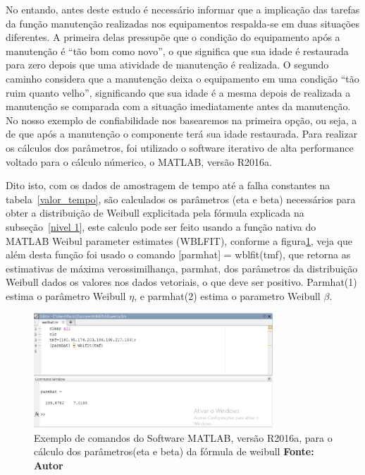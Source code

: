 No entando, antes deste estudo é necessário informar que a implicação das tarefas da função manutenção realizadas nos equipamentos respalda-se em duas situações diferentes. A primeira delas pressupõe que o condição do equipamento após a manutenção é “tão bom como novo”, o que significa que sua idade é restaurada para zero depois que uma atividade de manutenção é realizada. O segundo caminho considera que a manutenção deixa o equipamento em uma condição “tão ruim quanto velho”, significando que sua idade é a mesma depois de realizada a manutenção se comparada com a situação imediatamente antes da manutenção. No nosso exemplo de confiabilidade nos basearemos na primeira opção, ou seja, a de que após a manutenção o componente terá sua idade restaurada. Para realizar os cálculos dos parâmetros, foi utilizado o software iterativo de alta performance voltado para o cálculo númerico, o MATLAB, versão R2016a.

Dito isto, com os dados de amostragem de tempo até a falha constantes na tabela~\ref{valor_tempo}, são calculados os parâmetros (eta e beta) necessários para obter a distribuição de Weibull explicitada pela fórmula explicada na subseção~\ref{nivel 1}, este calculo pode ser feito usando a função nativa do MATLAB Weibul parameter estimates (WBLFIT), conforme a figura\ref{parametros_weibull}, veja que além desta função foi usado o comando [parmhat] = wblfit(tmf), que retorna as estimativas de máxima verossimilhança, parmhat, dos parâmetros da distribuição Weibull dados os valores nos dados vetoriais, o que deve ser positivo. Parmhat(1) estima o parâmetro Weibull $ \eta $, e parmhat(2) estima o parametro Weibull $ \beta $. 

\graphicspath{{figuras/}}
\begin{figure}[H]
\centering
\includegraphics[width=0.8\textwidth]{parametros_weibull.eps}
\caption{Exemplo de comandos do Software MATLAB, versão R2016a, para o cálculo dos parâmetros(eta e beta) da fórmula de weibull \textbf{Fonte: Autor}}
\label{parametros_weibull}
\end{figure}

